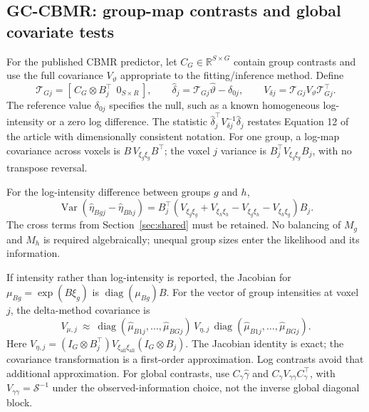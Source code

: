 \documentclass[11pt,a4paper]{article}
\newcommand{\R}{\mathbb{R}}
\newcommand{\diag}{\operatorname{diag}}
\newcommand{\Var}{\operatorname{Var}}
\numberwithin{equation}{section}
\begin{document}
\subsection{GC-CBMR: group-map contrasts and global covariate tests}
For the published CBMR predictor, let $C_G\in\R^{S\times G}$ contain group
contrasts and use the full covariance $V_\vartheta$ appropriate to the
fitting/inference method. Define
\begin{equation}\label{eq:group-contrast}
 \mathcal T_{Gj}=[\,C_G\otimes B_j^\top\ \ 0_{S\times R}\,],\qquad
 \widehat\delta_j=\mathcal T_{Gj}\widehat\vartheta-\delta_{0j},\qquad
 V_{\delta j}=\mathcal T_{Gj}V_\vartheta\mathcal T_{Gj}^\top.
\end{equation}
The reference value $\delta_{0j}$ specifies the null, such as a known
homogeneous log-intensity or a zero log difference. The statistic
$\widehat\delta_j^\top V_{\delta j}^{-1}\widehat\delta_j$ restates
Equation 12 of the article with dimensionally consistent notation.
For one group, a log-map covariance across voxels is
$B\,V_{\xi_g\xi_g}B^\top$; the voxel $j$ variance is
$B_j^\top V_{\xi_g\xi_g}B_j$, with no transpose reversal.

For the log-intensity difference between groups $g$ and $h$,
\begin{equation}
 \Var(\widehat\eta_{Bgj}-\widehat\eta_{Bhj})
 =B_j^\top
   (V_{\xi_g\xi_g}+V_{\xi_h\xi_h}
     -V_{\xi_g\xi_h}-V_{\xi_h\xi_g})B_j.
\end{equation}
The cross terms from Section~\ref{sec:shared} must be retained.
No balancing of $M_g$ and $M_h$ is required algebraically; unequal group
sizes enter the likelihood and its information.

If intensity rather than log-intensity is reported, the Jacobian for
$\mu_{Bg}=\exp(B\xi_g)$ is
$\diag(\mu_{Bg})B$. For the vector of group intensities at voxel $j$,
the delta-method covariance is
\[
 V_{\mu,j}\ \approx\
 \diag(\widehat\mu_{B1j},\ldots,\widehat\mu_{BGj})\,
 V_{\eta,j}\,
 \diag(\widehat\mu_{B1j},\ldots,\widehat\mu_{BGj}).
\]
Here $V_{\eta,j}=(I_G\otimes B_j^\top)
V_{\xi_{\mathrm{all}}\xi_{\mathrm{all}}}(I_G\otimes B_j)$.
The Jacobian identity is exact; the covariance transformation is a
first-order approximation. Log contrasts avoid that additional approximation.
For global contrasts, use $C_\gamma\widehat\gamma$ and
$C_\gamma V_{\gamma\gamma}C_\gamma^\top$, with
$V_{\gamma\gamma}=\mathcal S^{-1}$ under the observed-information choice,
not the inverse global diagonal block.
\end{document}
